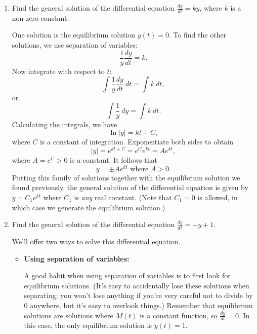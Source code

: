 \documentclass[main]{subfiles}
\begin{document}
\begin{enumerate}
\begin{enumerate}
  \end{enumerate}

\pspace{\newpage}

\item \begin{problem}[2.5in]
  Find the general solution of the differential equation $\displaystyle
  \frac{dy}{dt} =ky$, where $k$ is a non-zero constant.
  \end{problem}

 \begin{solution} 
   One solution is the equilibrium solution $y(t) = 0$.  
   To find the other solutions, we use separation of variables:
   $$
     \frac{1}{y} \frac{dy}{dt} = k.
   $$
   Now integrate with respect to $t$:
   $$
     \int \frac{1}{y} \frac{dy}{dt}~dt = \int k~dt,
   $$
   or 
   $$
     \int \frac{1}{y}~dy = \int k~dt.
   $$
   Calculating the integrals, we have
   $$
     \ln |y| = kt + C,
   $$
   where $C$ is a constant of integration.  Exponentiate both sides
   to obtain
   $$
     |y| = e^{kt + C} = e^{C} e^{kt} = A e^{kt},
   $$
   where $A = e^{C} > 0$ is a constant.  It follows that
   $$
      y = \pm Ae^{kt} \mbox{ where } A > 0.
   $$
   Putting this family of solutions together with the equilibrium
   solution we found previously, the general solution of the 
   differential equation is given by $y = C_{1} e^{kt}$ where
   $C_{1}$ is {\em any} real constant.  (Note that $C_{1} = 0$
   is allowed, in which case we generate the equilibrium solution.)
 \end{solution}
 
 \item \begin{problem}[2.5in]
  Find the general solution of the differential equation $\displaystyle
  \frac{dy}{dt} =-y + 1$.
  \end{problem}

 \begin{solution} 

  We'll offer two ways to solve this differential equation.
  \begin{itemize}
    \item \textbf{Using separation of variables:}

    A good habit when using separation of variables is to first look for
    equilibrium solutions.  (It's easy to accidentally lose these
    solutions when separating; you won't lose anything if you're very
    careful not to divide by 0 anywhere, but it's easy to overlook
    things.)  Remember that equilibrium solutions are solutions where
    $M(t)$ is a constant function, so $\frac{dy}{dt} = 0$.  In this
    case, the only equilibrium solution is $y(t) = 1$.


\end{itemize}
\end{solution}
\end{enumerate}
\end{document}
